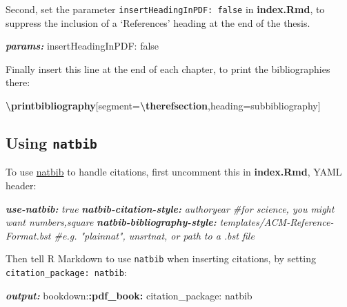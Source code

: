 \documentclass[a4paper, nobind]{templates/ociamthesis}
\newenvironment{Shaded}{\begin{snugshade}}{\end{snugshade}}
\newcommand{\AnnotationTok}[1]{\textcolor[rgb]{0.56,0.35,0.01}{\textbf{\textit{#1}}}}
\newcommand{\CommentTok}[1]{\textcolor[rgb]{0.56,0.35,0.01}{\textit{#1}}}
\newcommand{\FunctionTok}[1]{\textcolor[rgb]{0.13,0.29,0.53}{\textbf{#1}}}
\newcommand{\NormalTok}[1]{#1}
\newcommand{\SpecialCharTok}[1]{\textcolor[rgb]{0.81,0.36,0.00}{\textbf{#1}}}
\renewenvironment{Shaded}
{
  \vspace{10pt}%
  \begin{snugshade}%
}{%
  \end{snugshade}%
  \vspace{8pt}%
}
\begin{document}
Second, set the parameter \texttt{insertHeadingInPDF:\ false} in \textbf{index.Rmd}, to suppress the inclusion of a `References' heading at the end of the thesis.

\begin{Shaded}
\begin{Highlighting}[]
\AnnotationTok{params:}
\NormalTok{  insertHeadingInPDF: false}
\end{Highlighting}
\end{Shaded}

Finally insert this line at the end of each chapter, to print the bibliographies there:

\begin{Shaded}
\begin{Highlighting}[]
\FunctionTok{\textbackslash{}printbibliography}\NormalTok{[segment=}\FunctionTok{\textbackslash{}therefsection}\NormalTok{,heading=subbibliography]}
\end{Highlighting}
\end{Shaded}

\subsection{\texorpdfstring{Using \texttt{natbib}}{Using natbib}}\label{natbib-custom}

To use \href{https://www.overleaf.com/learn/latex/Bibliography_management_with_natbib}{natbib} to handle citations, first uncomment this in \textbf{index.Rmd}, YAML header:

\begin{Shaded}
\begin{Highlighting}[]
\AnnotationTok{use{-}natbib:}\CommentTok{ true}
\AnnotationTok{natbib{-}citation{-}style:}\CommentTok{ authoryear \#for science, you might want numbers,square}
\AnnotationTok{natbib{-}bibliography{-}style:}\CommentTok{ templates/ACM{-}Reference{-}Format.bst \#e.g. "plainnat", unsrtnat, or path to a .bst file}
\end{Highlighting}
\end{Shaded}

Then tell R Markdown to use \texttt{natbib} when inserting citations, by setting \texttt{citation\_package:\ natbib}:

\begin{Shaded}
\begin{Highlighting}[]
\AnnotationTok{output:}
\NormalTok{  bookdown:}\SpecialCharTok{:pdf\_book:}
\NormalTok{    citation\_package: natbib}
\end{Highlighting}
\end{Shaded}
\end{document}
